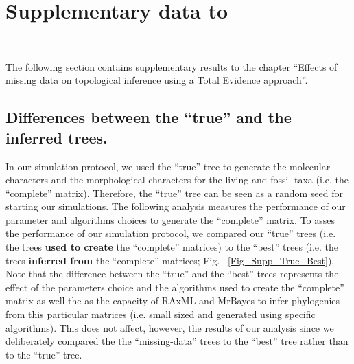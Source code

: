 %
%

\chapter{Supplementary data to }
\label{chap:Appendix_TEM_paper}

\bigskip
\medskip
\begin{center}

 \\
\bigskip
\end{center}

The following section contains supplementary results to the chapter ``Effects of missing data on topological inference using a Total Evidence approach''.

\section{Differences between the ``true'' and the inferred trees.}

In our simulation protocol, we used the ``true'' tree to generate the molecular characters and the morphological characters for the living and fossil taxa (i.e. the ``complete'' matrix).
Therefore, the ``true'' tree can be seen as a random seed for starting our simulations.
The following analysis measures the performance of our parameter and algorithms choices to generate the ``complete'' matrix.
To asses the performance of our simulation protocol, we compared our ``true'' trees (i.e. the trees \textbf{used to create} the ``complete'' matrices) to the ``best'' trees (i.e. the trees \textbf{inferred from} the ``complete'' matrices; Fig. ~\ref{Fig_Supp_True_Best}).
Note that the difference between the ``true'' and the ``best'' trees represents the effect of the parameters choice and the algorithms used to create the ``complete'' matrix as well the as the capacity of RAxML and MrBayes to infer phylogenies from this particular matrices (i.e. small sized and generated using specific algorithms).
This does not affect, however, the results of our analysis since we deliberately compared the the ``missing-data'' trees to the ``best'' tree rather than to the ``true'' tree. 


